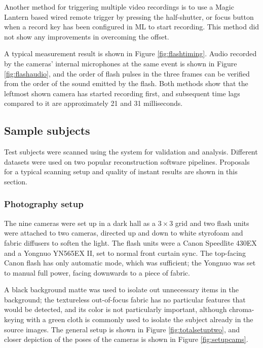Another method for triggering multiple video recordings is to use a Magic Lantern based wired remote trigger by pressing the half-shutter, or focus button when a record key has been configured in ML to start recording.
This method did not show any improvements in overcoming the offset.

A typical measurement result is shown in Figure \ref{fig:flashtiming}.
Audio recorded by the cameras' internal microphones at the same event is shown in Figure \ref{fig:flashaudio}, and the order of flash pulses in the three frames can be verified from the order of the sound emitted by the flash.
Both methods show that the leftmost shown camera has started recording first, and subsequent time lags compared to it are approximately 21 and 31 milliseconds.

\subsection{Sample subjects}


Test subjects were scanned using the system for validation and analysis.
Different datasets were used on two popular reconstruction software pipelines.
Proposals for a typical scanning setup and quality of instant results are shown in this section.

\subsubsection{Photography setup}

The nine cameras were set up in a dark hall as a $3 \times 3$ grid and two flash units were attached to two cameras, directed up and down to white styrofoam and fabric diffusers to soften the light.
The flash units were a Canon Speedlite 430EX and a Yongnuo YN565EX II, set to normal front curtain sync.
The top-facing Canon flash has only automatic mode, which was sufficient; the Yongnuo was set to manual full power, facing downwards to a piece of fabric.

A black background matte was used to isolate out unnecessary items in the background;
the textureless out-of-focus fabric has no particular features that would be detected, and its color is not particularly important, although chroma-keying with a green cloth is commonly used to isolate the subject already in the source images.
The general setup is shown in Figure \ref{fig:totalsetuptwo}, and closer depiction of the poses of the cameras is shown in Figure \ref{fig:setupcams}.

